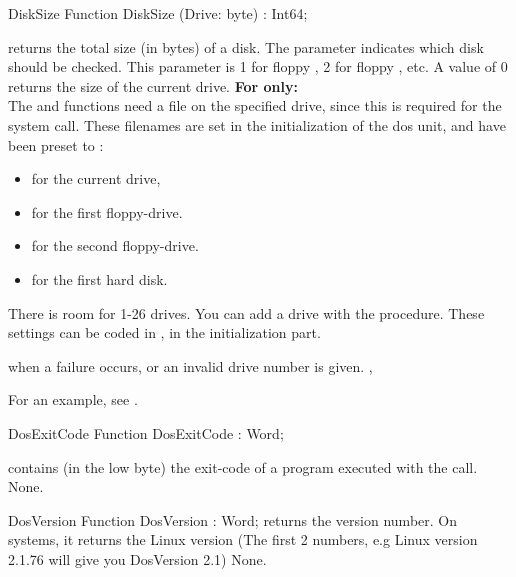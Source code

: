 
\begin{function}{DiskSize}
\Declaration
Function DiskSize (Drive: byte) : Int64;
\Description

 returns the total size (in bytes) of a disk. The parameter
 indicates which disk should be checked. This parameter is 1 for
floppy , 2 for floppy , etc. A value of 0 returns the size
of the current drive. 
\textbf{For \linux only:}\\
The  and  functions need a file on the specified drive, since this
is required for the  system call.
  These filenames are set in the initialization of the dos unit, and have 
been preset to :
\begin{itemize}
\item {} for the current drive, 
\item {} for the first floppy-drive.
\item {} for the second floppy-drive.
\item {} for the first hard disk.
\end{itemize}
There is room for 1-26 drives. You can add a drive with the
 procedure.
These settings can be coded in , in the initialization part.

 when a failure occurs, or an invalid drive number is given.
\SeeAlso
{}, 
\end{function}
For an example, see .
\begin{function}{DosExitCode}
\Declaration
Function DosExitCode  : Word;
\Description

 contains (in the low byte) the exit-code of a program 
executed with the  call.
\Errors
None.
\SeeAlso
{}
\end{function}


\begin{function}{DosVersion}
\Declaration
Function DosVersion  : Word;
\Description
{} returns the \dos version number. On \linux systems, it
returns the Linux version (The first 2 numbers, e.g Linux version 2.1.76 will
give you DosVersion 2.1)
\Errors
None.
\SeeAlso

\end{function}




